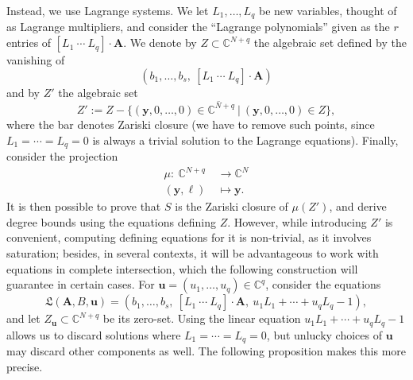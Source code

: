 \documentclass[12pt]{article}
\def\X{S}
\def\frkL{\mathfrak{L}}
\def\yb{{\bm y}}
\def\C{\mathbb{C}}
\begin{document}
Instead, we use Lagrange systems. We let $L_1,\hdots,L_q$ be new
variables, thought of as Lagrange multipliers, and consider the
``Lagrange polynomials'' given as the $r$ entries of $ [ L_1 ~\cdots~
  L_q]\cdot \bm A$. We denote by $Z \subset \C^{N+q}$ the algebraic set
defined by the vanishing of
\[ ( b_1,\dots,b_s, \  [ L_1 ~\cdots~ L_q]\cdot \bm A )\]
and by $Z'$ the algebraic set
\[
Z' := \overline{Z - \{(\yb,0,\dots,0) \in \C^{N+q}~|~(\yb,0,\dots,0) \in Z\}},
\]
where the bar denotes Zariski closure (we have to remove such points,
since $L_1=\cdots=L_q=0$ is always a trivial solution to the Lagrange
equations). Finally, consider the projection
\begin{align*} 
  \mu :~ \C^{N+q} &\rightarrow \C^{N}\\
  (\yb,\bm \ell)~ &\mapsto \yb.
\end{align*}
It is then possible to prove that $\X$ is the Zariski closure of
${\mu(Z')}$, and derive degree bounds using the equations defining
$Z$. However, while introducing $Z'$ is convenient, computing defining
equations for it is non-trivial, as it involves saturation; besides,
in several contexts, it will be advantageous to work with equations in
complete intersection, which the following construction will guarantee  in
certain cases. For $\bm u = (u_1,\dots,u_q) \in \C^q$, consider the
equations
\[\frkL(\bm A, B,\bm u) = ( b_1,\dots,b_s, \  [ L_1 ~\cdots~ L_q]\cdot \bm A,\ u_1 L_1 + \cdots + u_q L_q -1 ),\]
and let $Z_{\bm u} \subset \C^{N+q}$ be its zero-set. Using the linear
equation $u_1 L_1 + \cdots + u_q L_q -1$ allows us to discard
solutions where $L_1 = \cdots =L_q = 0$, but unlucky choices of $\bm
u$ may discard other components as well. The following proposition
makes this more precise.
\end{document}

